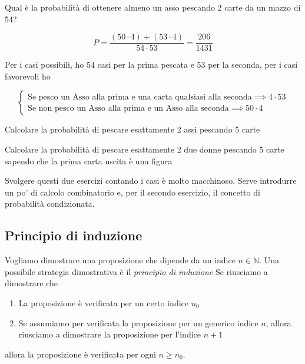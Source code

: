 \begin{exmp}
    Qual \`e la probabilit\`a di ottenere almeno un asso pescando 2 carte da un mazzo di 54?

    \begin{equation*}
    P = \dfrac{(50 \cdot 4) + (53 \cdot 4)}{54 \cdot 53} = \dfrac{206}{1431}
    \end{equation*}
    
    Per i casi possibili, ho 54 casi per la prima pescata e 53 per la seconda, per i casi favorevoli ho
    
    \begin{equation*}
    \begin{cases}
        \text{Se pesco un Asso alla prima e una carta qualsiasi alla seconda} \implies 4 \cdot 53 \\
        \text{Se non pesco un Asso alla prima e un Asso alla seconda} \implies 50 \cdot 4
    \end{cases}
    \end{equation*}
    
\end{exmp}
\begin{exrc}
    Calcolare la probabilit\`a di pescare esattamente 2 assi pescando 5 carte
    \end{exrc}
    \begin{exrc}
    Calcolare la probabilit\`a di pescare esattamente 2 due donne pescando 5 carte
    sapendo che la prima carta uscita \`e una figura
    \end{exrc}
    
    Svolgere questi due esercizi contando i casi \`e molto macchinoso. Serve introdurre un po' di calcolo 
    combinatorio e, per il secondo esercizio, il concetto di probabilit\`a condizionata.
    
    \subsection{Principio di induzione}
    
    Vogliamo dimostrare una proposizione che dipende da un indice $n\in\mathbb{N}$. Una possibile strategia dimostrativa \`e il {\em principio di induzione}
    Se riusciamo a dimostrare che
    \begin{enumerate}
    \item La proposizione \`e verificata per un certo indice $n_0$
    \item Se assumiamo per verificata la proposizione per un generico indice $n$, allora riusciamo a dimostrare
    la proposizione per l'indice $n+1$
    \end{enumerate}
    allora la proposizione  \`e verificata per ogni $n\ge n_0$.

